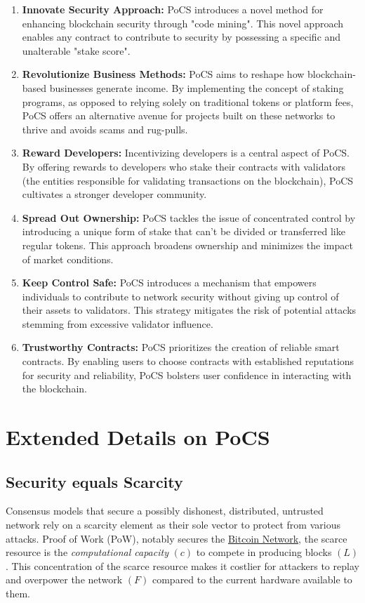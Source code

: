 \documentclass{article}
\begin{document}
\begin{enumerate}
    \item \textbf{Innovate Security Approach:} PoCS introduces a novel method for enhancing blockchain security through "code mining". This novel approach enables any contract to contribute to security by possessing a specific and unalterable "stake score".
    \item \textbf{Revolutionize Business Methods:} PoCS aims to reshape how blockchain-based businesses generate income. By implementing the concept of staking programs, as opposed to relying solely on traditional tokens or platform fees, PoCS offers an alternative avenue for projects built on these networks to thrive and avoids scams and rug-pulls.
    \item \textbf{Reward Developers:} Incentivizing developers is a central aspect of PoCS. By offering rewards to developers who stake their contracts with validators (the entities responsible for validating transactions on the blockchain), PoCS cultivates a stronger developer community.
    \item \textbf{Spread Out Ownership:} PoCS tackles the issue of concentrated control by introducing a unique form of stake that can't be divided or transferred like regular tokens. This approach broadens ownership and minimizes the impact of market conditions.
    \item \textbf{Keep Control Safe:} PoCS introduces a mechanism that empowers individuals to contribute to network security without giving up control of their assets to validators. This strategy mitigates the risk of potential attacks stemming from excessive validator influence.
    \item \textbf{Trustworthy Contracts:} PoCS prioritizes the creation of reliable smart contracts. By enabling users to choose contracts with established reputations for security and reliability, PoCS bolsters user confidence in interacting with the blockchain.
\end{enumerate}

\section{Extended Details on PoCS}

\subsection{Security equals Scarcity}

Consensus models that secure a possibly dishonest, distributed, untrusted network rely on a scarcity element as their sole vector to protect from various attacks. Proof of Work (PoW), notably secures the \href{https://bitcoin.org/bitcoin.pdf}{Bitcoin Network}, the scarce resource is the \textit{computational capacity} $(c)$ to compete in producing blocks $(L)$. This concentration of the scarce resource makes it costlier for attackers to replay and overpower the network $(F)$ compared to the current hardware available to them.
\end{document}
